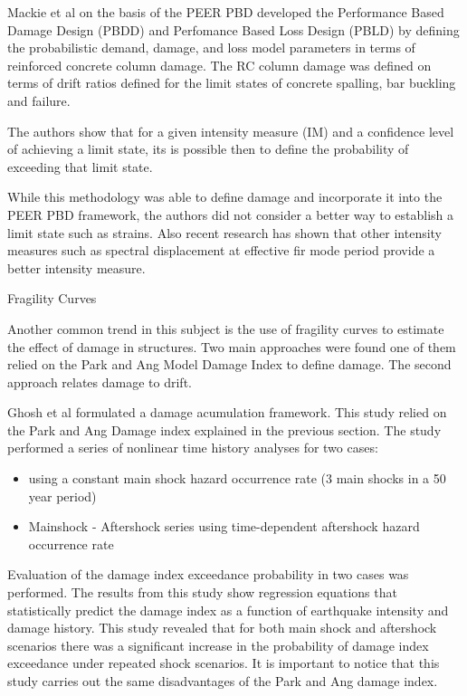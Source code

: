Mackie et al \cite{Mackie2007} on the basis of the PEER PBD developed the Performance Based Damage Design (PBDD) and Perfomance Based Loss Design (PBLD) by defining the probabilistic demand, damage, and loss model parameters in terms of reinforced concrete column damage. The RC column damage was defined on terms of drift ratios defined for the limit states of concrete spalling, bar buckling and failure. 

The authors show that for a given intensity measure (IM) and a confidence level of achieving a limit state, its is possible then to define the probability  of exceeding that limit state.

While this methodology was able to define damage and incorporate it into the PEER PBD framework, the authors did not consider a better way to establish a limit state such as strains. Also recent research has shown that other intensity measures such as spectral displacement at effective fir mode period provide a better intensity measure.


Fragility Curves

Another common trend in this subject is the use of fragility curves to estimate the effect of damage in structures. Two main approaches were found one of them relied on the Park and Ang Model Damage Index to define damage. The second approach relates damage to drift.

Ghosh et al \cite{Ghosh2015} formulated a damage acumulation framework. This study relied on the Park and Ang Damage index explained in the previous section. The study performed a series of nonlinear time history analyses for two cases:
\begin{itemize}
	\item using a constant main shock hazard occurrence rate (3 main shocks in a 50 year period)
	\item Mainshock - Aftershock series using time-dependent aftershock hazard occurrence rate
\end{itemize}

Evaluation of the damage index exceedance probability in two cases was performed. The results from this study show regression equations that statistically predict the damage index as a function of earthquake intensity and damage history. This study revealed that for both main shock and aftershock scenarios there was a significant increase in the probability of damage index exceedance under repeated shock scenarios. It is important to notice that this study carries out the same disadvantages of the Park and Ang damage index.

